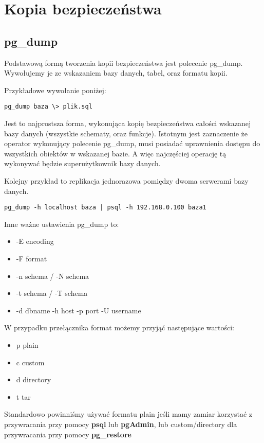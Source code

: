 	\section{Kopia bezpieczeństwa}
	\subsection{pg\_dump}
	
	Podstawową formą tworzenia kopii bezpieczeństwa jest polecenie pg\_dump. Wywołujemy je ze wskazaniem bazy danych, tabel, oraz formatu kopii. 
	
	Przykładowe wywołanie poniżej:
	\begin{lstlisting}
pg_dump baza \> plik.sql
\end{lstlisting}

Jest to najprostsza forma, wykonująca kopię bezpieczeństwa całości wskazanej bazy danych (wszystkie schematy, oraz funkcje). Istotnym jest zaznaczenie że operator wykonujący polecenie pg\_dump, musi posiadać uprawnienia dostępu do wszystkich obiektów w wskazanej bazie. A więc najczęściej operację tą wykonywać będzie superużytkownik bazy danych.

Kolejny przykład to replikacja jednorazowa pomiędzy dwoma serwerami bazy danych.
	
\begin{lstlisting}
pg_dump -h localhost baza | psql -h 192.168.0.100 baza1
\end{lstlisting}
	
Inne ważne ustawienia pg\_dump to:
\begin{itemize}
\item -E encoding
\item -F format
\item -n schema / -N schema
\item -t schema / -T schema
\item -d dbname -h host -p port -U username
\end{itemize}

W przypadku przełącznika format możemy przyjąć następujące wartości:
\begin{itemize}
	\item p plain
	\item c custom
	\item d directory
	\item t tar
\end{itemize} 
Standardowo powinniśmy używać formatu plain jeśli mamy zamiar korzystać z przywracania przy pomocy \textbf{psql} lub \textbf{pgAdmin}, lub custom/directory dla przywracania przy pomocy \textbf{pg\_restore}

